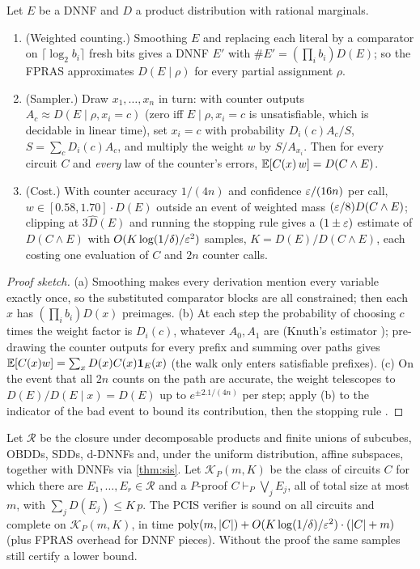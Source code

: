 \begin{theorem}\label{thm:sis}
Let $E$ be a DNNF and $D$ a product distribution with rational marginals.
\begin{enumerate}[label=(\alph*)]
\item (Weighted counting.) Smoothing $E$ and replacing each literal by a
comparator on $\lceil\log_2b_i\rceil$ fresh bits gives a DNNF $E'$ with
$\#E'=(\prod_ib_i)D(E)$; so the FPRAS approximates $D(E\mid\rho)$ for every
partial assignment $\rho$.
\item (Sampler.) Draw $x_1,\dots,x_n$ in turn: with counter outputs
$A_c\approx D(E\mid\rho,x_i=c)$ (zero iff $E\mid\rho,x_i=c$ is unsatisfiable, which is
decidable in linear time), set $x_i=c$ with probability
$D_i(c)A_c/S$, $S=\sum_cD_i(c)A_c$, and multiply the weight $w$ by $S/A_{x_i}$.
Then for every circuit $C$ and \emph{every} law of the counter's errors,
$\mathbb{E}[C(x)\,w]=D(C\wedge E)$.
\item (Cost.) With counter accuracy $1/(4n)$ and confidence $\varepsilon/(16n)$ per
call, $w\in[0.58,1.70]\cdot D(E)$ outside an event of weighted mass
$(\varepsilon/8)D(C\wedge E)$; clipping at $3\hat D(E)$ and running the stopping rule
gives a $(1\pm\varepsilon)$ estimate of $D(C\wedge E)$ with $O(K\log(1/\delta)/\varepsilon^2)$
samples, $K=D(E)/D(C\wedge E)$, each costing one evaluation of $C$ and $2n$
counter calls.
\end{enumerate}
\end{theorem}

\begin{proof}[Proof sketch]
(a) Smoothing makes every derivation mention every variable exactly once,
so the substituted comparator blocks are all constrained; then each $x$ has
$(\prod_ib_i)D(x)$ preimages. (b) At each step the probability of choosing $c$
times the weight factor is $D_i(c)$, whatever $A_0,A_1$ are (Knuth's
estimator \cite{knuth1975}); pre-drawing
the counter outputs for every prefix and summing over paths gives
$\mathbb{E}[C(x)w]=\sum_xD(x)C(x)\mathbf{1}_E(x)$ (the walk only enters satisfiable
prefixes). (c) On the event that all $2n$ counts on the path are accurate,
the weight telescopes to $D(E)/D(E\mid x)=D(E)$ up to $e^{\pm2.1/(4n)}$ per
step; apply (b) to the indicator of the bad event to bound its contribution,
then the stopping rule \cite{dklr2000}.
\end{proof}

\begin{theorem}\label{thm:certenv}
Let $\mathcal R$ be the closure under decomposable products and finite unions
of subcubes, OBDDs, SDDs, d-DNNFs and, under the uniform distribution, affine
subspaces, together with DNNFs via \cref{thm:sis}. Let
$\mathcal K_P(m,K)$ be the class of circuits $C$ for which there are
$E_1,\dots,E_r\in\mathcal R$ and a $P$-proof $C\vdash_P\bigvee_jE_j$, all of
total size at most $m$, with $\sum_jD(E_j)\le K\,p$. The PCIS verifier is sound
on all circuits and complete on $\mathcal K_P(m,K)$, in time
$\mathrm{poly}(m,|C|)+O(K\log(1/\delta)/\varepsilon^2)\cdot(|C|+m)$ (plus FPRAS overhead for
DNNF pieces). Without the proof the same samples still certify a lower
bound.
\end{theorem}

